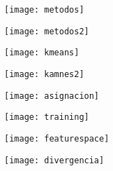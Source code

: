 \documentclass[14pt]{beamer}
\begin{document}
\begin{frame}
  \begin{figure}
    \centering
    \texttt{[image: metodos]}
  \end{figure}
\end{frame}
\begin{frame}
  \begin{figure}
    \centering
    \texttt{[image: metodos2]}
  \end{figure}
\end{frame}
\begin{frame}
  \begin{figure}
    \centering
    \texttt{[image: kmeans]}
  \end{figure}
\end{frame}
\begin{frame}
  \begin{figure}
    \centering
    \texttt{[image: kamnes2]}
  \end{figure}
\end{frame}
\begin{frame}
  \begin{figure}
    \centering
    \texttt{[image: asignacion]}
  \end{figure}
\end{frame}
\begin{frame}
  \begin{figure}
    \centering
    \texttt{[image: training]}
  \end{figure}
\end{frame}
\begin{frame}
  \begin{figure}
    \centering
    \texttt{[image: featurespace]}
  \end{figure}
\end{frame}
\begin{frame}
  \begin{figure}
    \centering
    \texttt{[image: divergencia]}
  \end{figure}
\end{frame}
\end{document}

